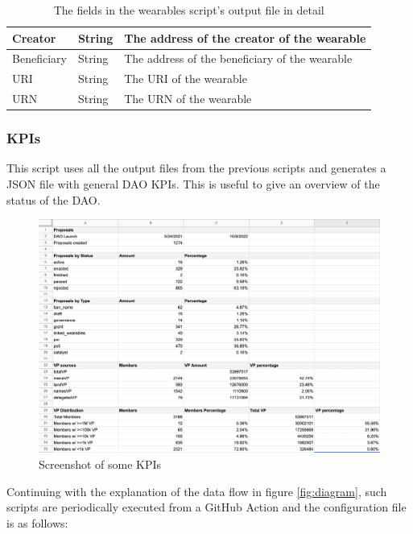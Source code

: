 \documentclass[MSE,Master,english]{twbook}%
\begin{document}
\begin{table}[H]
\begin{tabularx}{\textwidth}{|l|l|X|}
  Creator      & String  & The address of the creator of the wearable       \\ \hline
  Beneficiary  & String  & The address of the beneficiary of the wearable   \\ \hline
  URI          & String  & The URI of the wearable                          \\ \hline
  URN          & String  & The URN of the wearable                          \\ \hline
  \end{tabularx}
  \caption{The fields in the wearables script's output file in detail}
  \label{table:wearables}
\end{table}

\subsubsection{KPIs}
This script uses all the output files from the previous scripts and generates a JSON file with general DAO KPIs. This is useful to give an overview of the status of the DAO.
\begin{figure}[H]
  \centering
  \includegraphics[width=\textwidth]{kpis.png}
  \caption{Screenshot of some KPIs}
  \label{fig:kpis}
\end{figure}

\pagebreak

Continuing with the explanation of the data flow in figure \ref{fig:diagram}, such scripts are periodically executed from a GitHub Action and the configuration file\cite{configFile} is as follows: \\
\end{document}
